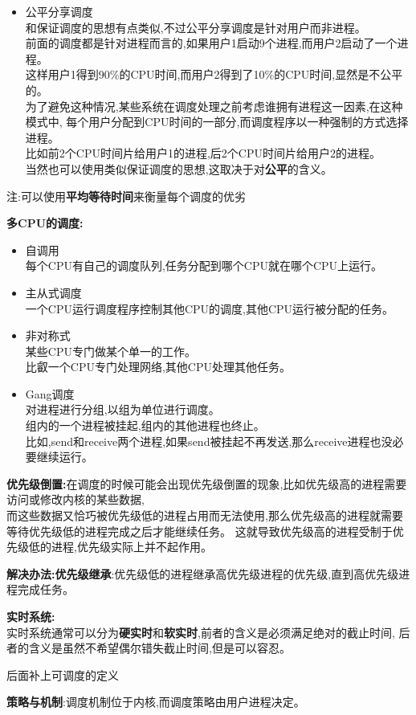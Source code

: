 \documentclass[UTF8,a4paper]{ctexart}
\newcommand{\spaceline}{\vspace{\baselineskip}}
\begin{document}
\begin{itemize}
      \item 公平分享调度\\
      和保证调度的思想有点类似,不过公平分享调度是针对用户而非进程。\\
      前面的调度都是针对进程而言的,如果用户1启动9个进程,而用户2启动了一个进程。\\
      这样用户1得到90\%的CPU时间,而用户2得到了10\%的CPU时间,显然是不公平的。\\
      为了避免这种情况,某些系统在调度处理之前考虑谁拥有进程这一因素,在这种模式中,
      每个用户分配到CPU时间的一部分,而调度程序以一种强制的方式选择进程。\\
      比如前2个CPU时间片给用户1的进程,后2个CPU时间片给用户2的进程。\\
      当然也可以使用类似保证调度的思想,这取决于对\textbf{公平}的含义。

    \end{itemize}

    注:可以使用\textbf{平均等待时间}来衡量每个调度的优劣

    \spaceline
    \textbf{多CPU的调度:}
    \begin{itemize}
      \item 自调用\\
      每个CPU有自己的调度队列,任务分配到哪个CPU就在哪个CPU上运行。
      \item 主从式调度\\
      一个CPU运行调度程序控制其他CPU的调度,其他CPU运行被分配的任务。
      \item 非对称式\\
      某些CPU专门做某个单一的工作。\\
      比叡一个CPU专门处理网络,其他CPU处理其他任务。
      \item Gang调度\\
      对进程进行分组,以组为单位进行调度。\\
      组内的一个进程被挂起,组内的其他进程也终止。\\
      比如,send和receive两个进程,如果send被挂起不再发送,那么receive进程也没必要继续运行。
    \end{itemize}

    \spaceline
    \textbf{优先级倒置:}在调度的时候可能会出现优先级倒置的现象,比如优先级高的进程需要访问或修改内核的某些数据,\\
    而这些数据又恰巧被优先级低的进程占用而无法使用,那么优先级高的进程就需要等待优先级低的进程完成之后才能继续任务。
    这就导致优先级高的进程受制于优先级低的进程,优先级实际上并不起作用。

    \textbf{解决办法:优先级继承}:优先级低的进程继承高优先级进程的优先级,直到高优先级进程完成任务。

    \spaceline
    \textbf{实时系统:}\\
    实时系统通常可以分为\textbf{硬实时}和\textbf{软实时},前者的含义是必须满足绝对的截止时间,
    后者的含义是虽然不希望偶尔错失截止时间,但是可以容忍。

    {\color{red}后面补上可调度的定义}

    \spaceline
    \textbf{策略与机制}:调度机制位于内核,而调度策略由用户进程决定。
\end{document}
